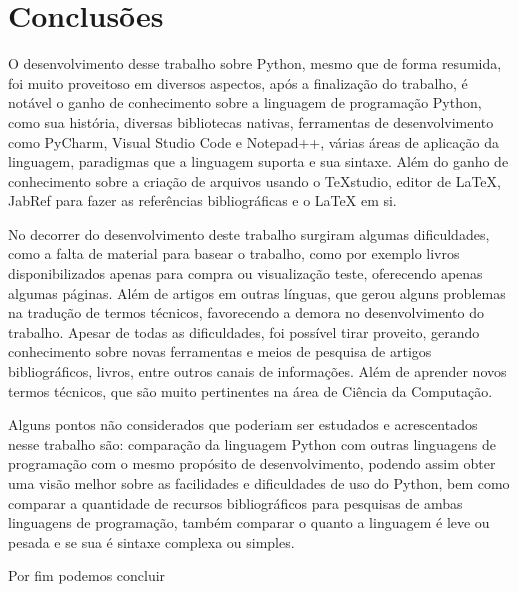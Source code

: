 

\chapter{Conclusões}

O desenvolvimento desse trabalho sobre Python, mesmo que de forma resumida, foi muito proveitoso em diversos aspectos, após a finalização do trabalho, é notável o ganho de conhecimento sobre a linguagem de programação Python, como sua história, diversas bibliotecas nativas, ferramentas de desenvolvimento como PyCharm, Visual Studio Code e Notepad++, várias áreas de aplicação da linguagem, paradigmas que a linguagem suporta e sua sintaxe. Além do ganho de conhecimento sobre a criação de arquivos usando o TeXstudio, editor de LaTeX, JabRef para fazer as referências bibliográficas e o LaTeX em si. 

No decorrer do desenvolvimento deste trabalho surgiram algumas dificuldades, como a falta de material para basear o trabalho, como por exemplo livros disponibilizados apenas para compra ou visualização teste, oferecendo apenas algumas páginas. Além de artigos em outras línguas, que gerou alguns problemas na tradução de termos técnicos, favorecendo a demora no desenvolvimento do trabalho. Apesar de todas as dificuldades, foi possível tirar proveito, gerando conhecimento sobre novas ferramentas e meios de pesquisa de artigos bibliográficos, livros, entre outros canais de informações. Além de aprender novos termos técnicos, que são muito pertinentes na área de Ciência da Computação.

Alguns pontos não considerados que poderiam ser estudados e acrescentados nesse trabalho são: comparação da linguagem Python com outras linguagens de programação com o mesmo propósito de desenvolvimento, podendo assim obter uma visão melhor sobre as facilidades e dificuldades de uso do Python, bem como comparar a quantidade de recursos bibliográficos para pesquisas de ambas linguagens de programação, também comparar o quanto a linguagem é leve ou pesada e se sua  é sintaxe complexa ou simples. 

Por fim podemos concluir